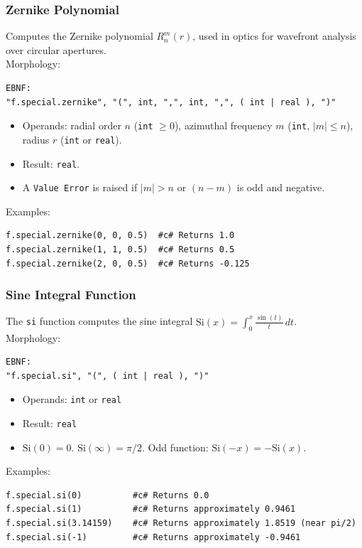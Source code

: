 \subsubsection{Zernike Polynomial}
Computes the Zernike polynomial $R_n^m(r)$, used in optics for wavefront analysis over circular apertures. \\
Morphology:
\begin{verbatim}
EBNF:
"f.special.zernike", "(", int, ",", int, ",", ( int | real ), ")"
\end{verbatim}
\begin{itemize}
\item Operands: radial order $n$ (\texttt{int} $\geq 0$), azimuthal frequency $m$ (\texttt{int}, $|m| \leq n$), radius $r$ (\texttt{int} or \texttt{real}).
\item Result: \texttt{real}.
\item A \texttt{Value Error} is raised if $|m| > n$ or $(n - m)$ is odd and negative.
\end{itemize}
Examples:
\begin{verbatim}
f.special.zernike(0, 0, 0.5)  #c# Returns 1.0
f.special.zernike(1, 1, 0.5)  #c# Returns 0.5
f.special.zernike(2, 0, 0.5)  #c# Returns -0.125
\end{verbatim}

\subsubsection{Sine Integral Function}
The \texttt{si} function computes the sine integral $\text{Si}(x) = \int_0^x \frac{\sin(t)}{t}\,dt$. \\
Morphology:
\begin{verbatim}
EBNF:
"f.special.si", "(", ( int | real ), ")"
\end{verbatim}
\begin{itemize}
\item Operands: \texttt{int} or \texttt{real}
\item Result: \texttt{real}
\item $\text{Si}(0) = 0$. $\text{Si}(\infty) = \pi/2$. Odd function: $\text{Si}(-x) = -\text{Si}(x)$.
\end{itemize}
Examples:
\begin{verbatim}
f.special.si(0)          #c# Returns 0.0
f.special.si(1)          #c# Returns approximately 0.9461
f.special.si(3.14159)    #c# Returns approximately 1.8519 (near pi/2)
f.special.si(-1)         #c# Returns approximately -0.9461
\end{verbatim}

